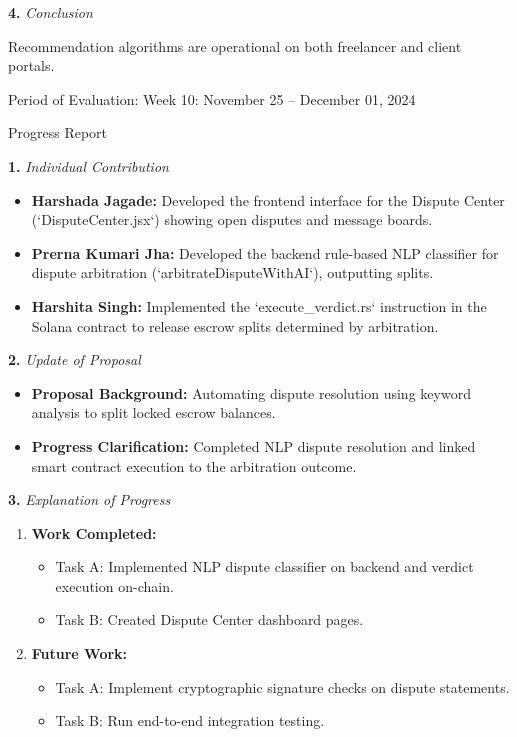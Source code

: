\documentclass[12pt]{article}
\newcommand{\phasetitle}[1]{{\large Period of Evaluation: #1}\par\vspace{4pt}}
\newcommand{\progressreport}{{\large Progress Report}\par\vspace{4pt}}
\newcommand{\subhead}[2]{\textbf{#1.} \textit{#2}\par}
\begin{document}
\subhead{4}{Conclusion}
Recommendation algorithms are operational on both freelancer and client portals.

\newpage

\phasetitle{Week 10: November 25 -- December 01, 2024}

\progressreport

\subhead{1}{Individual Contribution}
\begin{itemize}[leftmargin=2em]
    \item \textbf{Harshada Jagade:} Developed the frontend interface for the Dispute Center (`DisputeCenter.jsx`) showing open disputes and message boards.
    \item \textbf{Prerna Kumari Jha:} Developed the backend rule-based NLP classifier for dispute arbitration (`arbitrateDisputeWithAI`), outputting splits.
    \item \textbf{Harshita Singh:} Implemented the `execute\_verdict.rs` instruction in the Solana contract to release escrow splits determined by arbitration.
\end{itemize}

\subhead{2}{Update of Proposal}
\begin{itemize}[leftmargin=2em]
    \item \textbf{Proposal Background:} Automating dispute resolution using keyword analysis to split locked escrow balances.
    \item \textbf{Progress Clarification:} Completed NLP dispute resolution and linked smart contract execution to the arbitration outcome.
\end{itemize}

\newpage

\subhead{3}{Explanation of Progress}
\begin{enumerate}[leftmargin=2em]
    \item \textbf{Work Completed:}
    \begin{itemize}[leftmargin=2em]
        \item Task A: Implemented NLP dispute classifier on backend and verdict execution on-chain.
        \item Task B: Created Dispute Center dashboard pages.
    \end{itemize}
    \item \textbf{Future Work:}
    \begin{itemize}[leftmargin=2em]
        \item Task A: Implement cryptographic signature checks on dispute statements.
        \item Task B: Run end-to-end integration testing.
    \end{itemize}
\end{enumerate}
\end{document}

